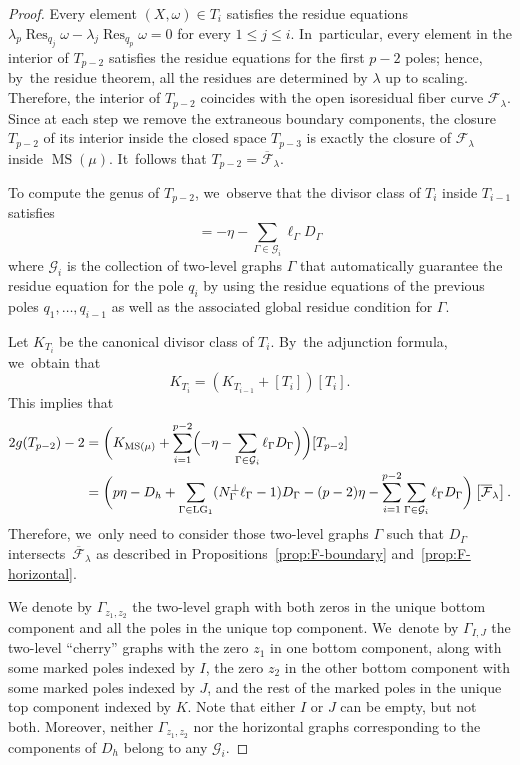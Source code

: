 \documentclass[11pt]{article}
\DeclareMathOperator\LG{LG}
\DeclareMathOperator\MS{MS}
\DeclareMathOperator\Res{Res}
\theoremstyle{definition}
\begin{document}
\begin{proof}
Every element $(X,\omega)\in T_i$ satisfies the residue equations $\lambda_{p} \Res_{q_j}\omega-\lambda_{j} \Res_{q_p}\omega=0$ for every $1\leq j \leq i$. In~particular, every element in the interior of $T_{p-2}$ satisfies the residue equations for the first $p-2$ poles; hence, by~the residue theorem, all the residues are determined by $\lambda$ up to scaling. Therefore, the interior of $T_{p-2}$ coincides with the open isoresidual fiber curve $\mathcal{F}_\lambda$. Since at each step we remove the extraneous boundary components, the closure $T_{p-2}$ of its interior inside the closed space $T_{p-3}$ is exactly the closure of $\mathcal{F}_\lambda$ inside $\MS(\mu)$. It~follows that $T_{p-2}=\overline{\mathcal F}_\lambda$.

To compute the genus of $T_{p-2}$, we~observe that the divisor class of $T_i$ inside $T_{i-1}$ satisfies
\begin{equation*}
[T_i]=-\eta-\sum_{\Gamma\in \mathcal{G}_i}\ell_{\Gamma}D_{\Gamma}
\end{equation*}
where $\mathcal{G}_i$ is the collection of two-level graphs $\Gamma$ that automatically guarantee the residue equation for the pole $q_i$ by using the residue equations of the previous poles $q_1,\ldots, q_{i-1}$ as well as the associated global residue condition for $\Gamma$.

Let $K_{T_{i}}$ be the canonical divisor class of $T_i$. By~the adjunction formula, we~obtain that
\begin{equation*}
K_{T_i} = \left(K_{T_{i-1}} + [T_i]\right)[T_i].
\end{equation*}
This implies that
\begin{align*}
2g (T_{p-2})-2 & = \biggl(K_{\MS(\mu)} + \sum_{i=1}^{p-2}\Bigl( -\eta-\sum_{\Gamma\in \mathcal{G}_i}\ell_{\Gamma}D_{\Gamma} \Bigr)\biggr)[T_{p-2}] \\
& = \biggl( p\eta -D_h + \sum_{\Gamma \in \LG_1}(N_{\Gamma}^\bot\ell_{\Gamma}-1)D_{\Gamma} - (p-2)\eta - \sum_{i=1}^{p-2}\sum_{\Gamma \in \mathcal{G}_i}\ell_{\Gamma} D_{\Gamma} \biggr)\left[\overline{\mathcal F}_\lambda\right].
\end{align*}
Therefore, we~only need to consider those two-level graphs $\Gamma$ such that $D_{\Gamma}$ intersects~$\overline{\mathcal F}_\lambda$ as described in Propositions~\ref{prop:F-boundary} and~\ref{prop:F-horizontal}.

We denote by $\Gamma_{z_1,z_2}$ the two-level graph with both zeros in the unique bottom component and all the poles in the unique top component. We~denote by $\Gamma_{I,J}$ the two-level ``cherry'' graphs with the zero $z_1$ in one bottom component, along with some marked poles indexed by $I$, the zero $z_2$ in the other bottom component with some marked poles indexed by $J$, and the rest of the marked poles in the unique top component indexed by $K$. Note that either $I$ or $J$ can be empty, but not both. Moreover, neither $\Gamma_{z_1,z_2}$ nor the horizontal graphs corresponding to the components of $D_h$ belong to any $\mathcal{G}_i$.


\end{proof}
\end{document}

